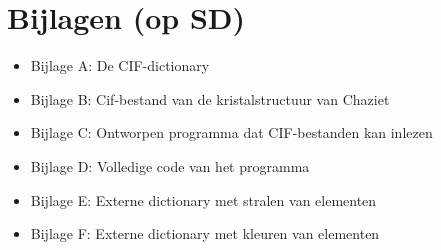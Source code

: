 \chapter*{Bijlagen (op SD)}

\begin{itemize}  

\item Bijlage A: \qquad	De CIF-dictionary 

\item Bijlage B: \qquad	Cif-bestand van de kristalstructuur van Chaziet  

\item Bijlage C: \qquad	Ontworpen programma dat CIF-bestanden kan inlezen

\item Bijlage D: \qquad	Volledige code van het programma 

\item Bijlage E: \qquad Externe dictionary met stralen van elementen

\item Bijlage F: \qquad Externe dictionary met kleuren van elementen
\end{itemize}


